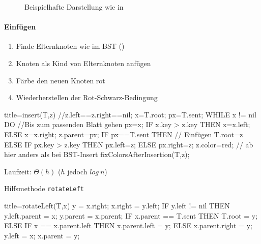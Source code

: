 \documentclass[
    ngerman,
    color=3b,
    dark_mode,
    summary,
    boxarc,
]{rubos-tuda-template}
\begin{document}
\begin{figure}[ht]
    \centering
    \caption{Beispielhafte Darstellung wie in }
    \label{fig:red_black_tree_example}
\end{figure}
\clearpage
\paragraph{Einfügen}
\begin{enumerate}
    \item Finde Elternknoten wie im BST ()
    \item Knoten als Kind von Elternknoten anfügen
    \item Färbe den neuen Knoten rot
    \item Wiederherstellen der Rot-Schwarz-Bedingung
\end{enumerate}
\begin{codeBlock}[autogobble,escapeinside=||]{title={insert(T,z) //z.left==z.right==nil;}}
    x=T.root; px=T.sent;
    WHILE x != nil DO                   //Bis zum passenden Blatt gehen
        px=x;
        IF x.key > z.key THEN
            x=x.left;
        ELSE
            x=x.right;
    z.parent=px;
    IF px==T.sent THEN                  // Einfügen
        T.root=z
    ELSE
        IF px.key > z.key THEN
            px.left=z;
        ELSE
            px.right=z;
    z.color=red;                        // ab hier anders als bei BST-Insert
    fixColorsAfterInsertion(T,z);
\end{codeBlock} 
Laufzeit: $\Theta(h)$ ($h$ jedoch $log~n$)

Hilfsmethode \texttt{rotateLeft}
\begin{codeBlock}[autogobble]{title={rotateLeft(T,x)}}
    y = x.right;
    x.right = y.left;
    IF y.left != nil THEN
        y.left.parent = x;
    y.parent = x.parent;
    IF x.parent == T.sent THEN
        T.root = y;
    ELSE
        IF x == x.parent.left THEN
            x.parent.left = y;
        ELSE
            x.parent.right = y;
    y.left = x;
    x.parent = y;
\end{codeBlock}
\clearpage
\end{document}
